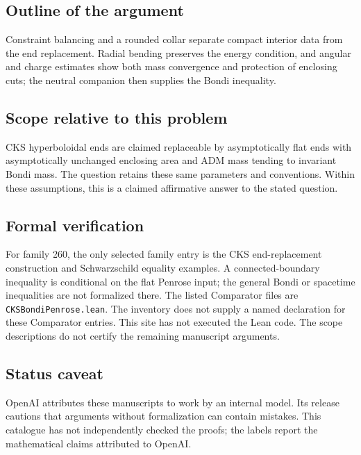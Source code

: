 \documentclass[11pt]{article}
\begin{document}
\subsection{Outline of the argument}
Constraint balancing and a rounded collar separate compact interior data from the end replacement. Radial bending preserves the energy condition, and angular and charge estimates show both mass convergence and protection of enclosing cuts; the neutral companion then supplies the Bondi inequality.

\subsection{Scope relative to this problem}
CKS hyperboloidal ends are claimed replaceable by asymptotically flat ends with asymptotically unchanged enclosing area and ADM mass tending to invariant Bondi mass. The question retains these same parameters and conventions. Within these assumptions, this is a claimed affirmative answer to the stated question.

\subsection{Formal verification}
For family 260, the only selected family entry is the CKS end-replacement construction and Schwarzschild equality examples. A connected-boundary inequality is conditional on the flat Penrose input; the general Bondi or spacetime inequalities are not formalized there. The listed Comparator files are \texttt{CKSBondiPenrose.lean}. The inventory does not supply a named declaration for these Comparator entries. This site has not executed the Lean code. The scope descriptions do not certify the remaining manuscript arguments.

\subsection{Status caveat}
OpenAI attributes these manuscripts to work by an internal model. Its release cautions that arguments without formalization can contain mistakes. This catalogue has not independently checked the proofs; the labels report the mathematical claims attributed to OpenAI.
\end{document}
